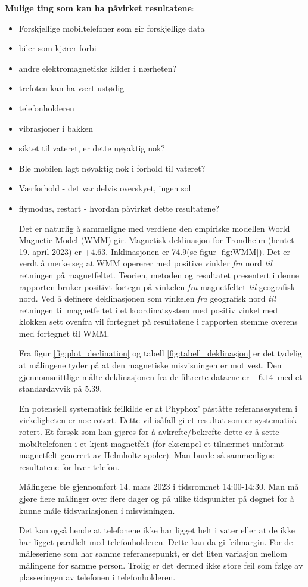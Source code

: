 \noindent\textbf{Mulige ting som kan ha påvirket resultatene}:
\begin{itemize}
    \item Forskjellige mobiltelefoner som gir forskjellige data 
    \item biler som kjører forbi
    \item andre elektromagnetiske kilder i nærheten? 
    \item trefoten kan ha vært ustødig
    \item telefonholderen
    \item vibrasjoner i bakken               
    \item siktet til vateret, er dette nøyaktig nok?
    \item Ble mobilen lagt nøyaktig nok i forhold til vateret?
    \item Værforhold - det var delvis overskyet, ingen sol
    \item flymodus, restart - hvordan påvirket dette resultatene?

Det er naturlig å sammeligne med verdiene den empiriske modellen World Magnetic Model (WMM) gir.
Magnetisk deklinasjon for Trondheim (hentet 19. april 2023) er +4.63\textdegree. Inklinasjonen er 74.9\textdegree (se figur \ref{fig:WMM}). 
\newline
Det er verdt å merke seg at WMM opererer med positive vinkler \textit{fra} nord \textit{til} retningen på magnetfeltet. 
Teorien, metoden og resultatet presentert i denne rapporten bruker positivt fortegn på vinkelen \textit{fra} magnetfeltet \textit{til} geografisk nord.
Ved å definere deklinasjonen som vinkelen \textit{fra} geografisk nord \textit{til} retningen til magnetfeltet i et koordinatsystem med positiv vinkel med klokken sett ovenfra vil fortegnet på resultatene i rapporten stemme overens med fortegnet til WMM.  
\par
Fra figur \ref{fig:plot_declination} og tabell \ref{fig:tabell_deklinasjon} er det tydelig at målingene tyder på at den magnetiske misvisningen er mot vest. Den gjennomsnittlige målte deklinasjonen fra de filtrerte dataene er $-6.14$\textdegree\ med et standardavvik på $5.39$\textdegree.
\par
En potensiell systematisk feilkilde er at Phyphox' påståtte referansesystem i virkeligheten er noe rotert. Dette vil isåfall gi et resultat som er systematisk rotert. 
Et forsøk som kan gjøres for å avkrefte/bekrefte dette er å sette mobiltelefonen i et kjent magnetfelt (for eksempel et tilnærmet uniformt magnetfelt generert av Helmholtz-spoler).
Man burde så sammenligne resultatene for hver telefon.
\par
Målingene ble gjennomført 14. mars 2023 i tidsrommet 14:00-14:30.
Man må gjøre flere målinger over flere dager og på ulike tidspunkter på døgnet for å kunne måle tidsvariasjonen i misvisningen. 
\par
Det kan også hende at telefonene ikke har ligget helt i vater eller at de ikke har ligget parallelt med telefonholderen. Dette kan da gi feilmargin. For de måleseriene som har samme referansepunkt, er det liten variasjon mellom målingene for samme person. Trolig er det dermed ikke store feil som følge av plasseringen av telefonen i telefonholderen. 


\end{itemize}

